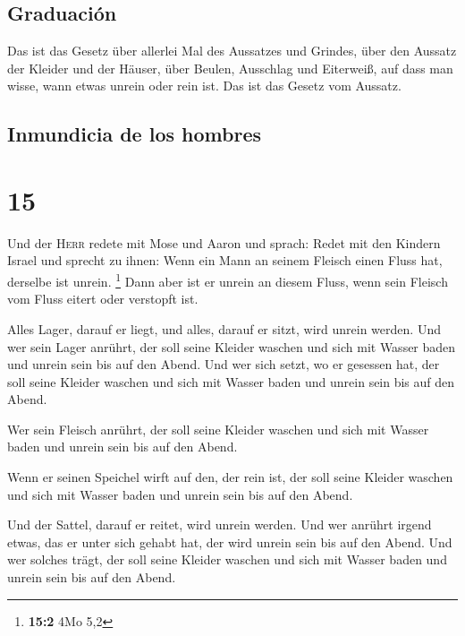 \hypertarget{graduaciuxf3n}{%
\subsection{Graduación}\label{graduaciuxf3n}}

 Das ist das Gesetz über allerlei Mal des Aussatzes und
Grindes,  über den Aussatz der Kleider und der Häuser,
 über Beulen, Ausschlag und Eiterweiß, 
auf dass man wisse, wann etwas unrein oder rein ist. Das ist das Gesetz
vom Aussatz.

\hypertarget{inmundicia-de-los-hombres}{%
\subsection{Inmundicia de los hombres}\label{inmundicia-de-los-hombres}}

\hypertarget{section-14}{%
\section{15}\label{section-14}}

 Und der \textsc{Herr} redete mit Mose und Aaron und
sprach:  Redet mit den Kindern Israel und sprecht zu
ihnen: Wenn ein Mann an seinem Fleisch einen Fluss hat, derselbe ist
unrein. \footnote{\textbf{15:2} 4Mo 5,2}  Dann aber ist er
unrein an diesem Fluss, wenn sein Fleisch vom Fluss eitert oder
verstopft ist.

 Alles Lager, darauf er liegt, und alles, darauf er sitzt,
wird unrein werden.  Und wer sein Lager anrührt, der soll
seine Kleider waschen und sich mit Wasser baden und unrein sein bis auf
den Abend.  Und wer sich setzt, wo er gesessen hat, der
soll seine Kleider waschen und sich mit Wasser baden und unrein sein bis
auf den Abend.

 Wer sein Fleisch anrührt, der soll seine Kleider waschen
und sich mit Wasser baden und unrein sein bis auf den Abend.

 Wenn er seinen Speichel wirft auf den, der rein ist, der
soll seine Kleider waschen und sich mit Wasser baden und unrein sein bis
auf den Abend.

 Und der Sattel, darauf er reitet, wird unrein werden.
 Und wer anrührt irgend etwas, das er unter sich gehabt
hat, der wird unrein sein bis auf den Abend. Und wer solches trägt, der
soll seine Kleider waschen und sich mit Wasser baden und unrein sein bis
auf den Abend.

